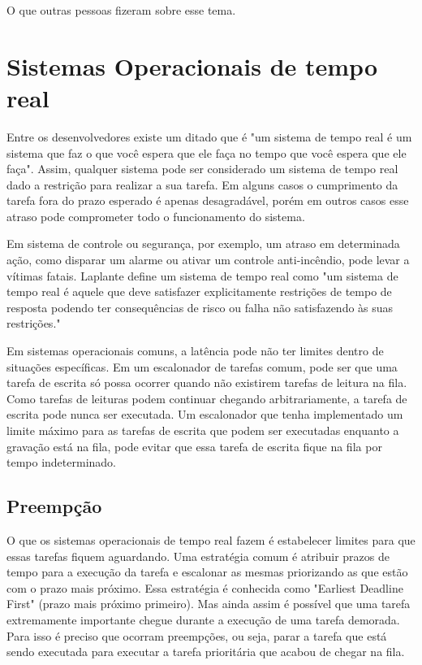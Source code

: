 
O que outras pessoas fizeram sobre esse tema.

\section{Sistemas Operacionais de tempo real}

Entre os desenvolvedores existe um ditado que é "um sistema de tempo real é um sistema que faz o que você espera que ele faça no tempo que você espera que ele faça". Assim, qualquer sistema pode ser considerado um sistema de tempo real dado a restrição para realizar a sua tarefa. Em alguns casos o cumprimento da tarefa fora do prazo esperado é apenas desagradável, porém em outros casos esse atraso pode comprometer todo o funcionamento do sistema. 

Em sistema de controle ou segurança, por exemplo, um atraso em determinada ação, como disparar um alarme ou ativar um controle anti-incêndio, pode levar a vítimas fatais. Laplante \cite{Laplante2004} define um sistema de tempo real como "um sistema de tempo real é aquele que deve satisfazer explicitamente restrições de tempo de resposta podendo ter consequências de risco ou falha não satisfazendo às suas restrições."

Em sistemas operacionais comuns, a latência pode não ter limites dentro de situações específicas. Em um escalonador de tarefas comum, pode ser que uma tarefa de escrita só possa ocorrer quando não existirem tarefas de leitura na fila. Como tarefas de leituras podem continuar chegando arbitrariamente, a tarefa de escrita pode nunca ser executada. Um escalonador que tenha implementado um limite máximo para as tarefas de escrita que podem ser executadas enquanto a gravação está na fila, pode evitar que essa tarefa de escrita fique na fila por tempo indeterminado.

\subsection{Preempção}

O que os sistemas operacionais de tempo real fazem é estabelecer limites para que essas tarefas fiquem aguardando. Uma estratégia comum é atribuir prazos de tempo para a execução da tarefa e escalonar as mesmas priorizando as que estão com o prazo mais próximo. Essa estratégia é conhecida como "Earliest Deadline First" (prazo mais próximo primeiro). Mas ainda assim é possível que uma tarefa extremamente importante chegue durante a execução de uma tarefa demorada. Para isso é preciso que ocorram preempções, ou seja, parar a tarefa que está sendo executada para executar a tarefa prioritária que acabou de chegar na fila.

